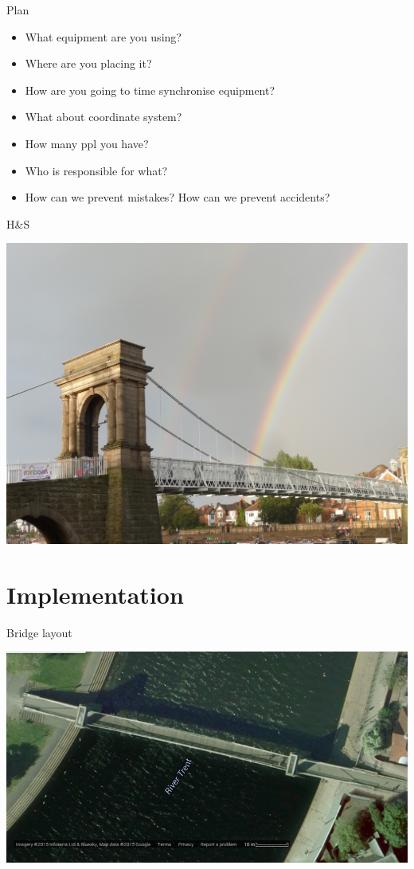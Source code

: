 \documentclass[11pt]{beamer}
\begin{document}
\begin{frame}{Plan}%
\begin{itemize}
	\item What equipment are you using? 
	\item Where are you placing it?
	\item	How are you going to time synchronise equipment?
	\item What about coordinate system?
	\item How many ppl you have?
	\item Who is responsible for what?
	\item How can we prevent mistakes? How can we prevent accidents?
\end{itemize}
\end{frame}

\begin{frame}{H\&S}%
\begin{center}
	\includegraphics[width=.8\textwidth]{pic/rainbow.jpg}
\end{center}
\end{frame}


\section{Implementation}

\begin{frame}{Bridge layout}%
	\begin{center}
	\includegraphics[height=.6\textheight]{pic/BridgeBare.jpg}
	\end{center}
\end{frame}
\end{document}

